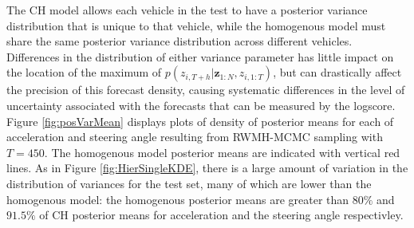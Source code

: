 \documentclass[12pt,a4paper]{article}\usepackage[]{graphicx}\usepackage[]{color}
\begin{document}
\begin{table}[ht]
\centering
{}
\caption{Mean forecast Euclidean error in metres for the the best Naive model, Naive 8, and each time series model at a forecast horizon of one second, two seconds and three seconds. Each time series model performs significantly better than Naive 8, and are very competitive with each other. The use of UVB for the IH model appears to have increased the forecast error relative to MCMC and VB inference for this model.}
\label{table:meanError}
\end{table}

The CH model allows each vehicle in the test to have a posterior variance distribution that is unique to that vehicle, while the homogenous model must share the same posterior variance distribution across different vehicles. Differences in the distribution of either variance parameter has little impact on the location of the maximum of $p(z_{i, T+h} | \textbf{z}_{1:N}, z_{i, 1:T})$, but can drastically affect the precision of this forecast density, causing systematic differences in the level of uncertainty associated with the forecasts that can be measured by the logscore.
\\

Figure \ref{fig:posVarMean} displays plots of density of posterior means for each of acceleration and steering angle resulting from RWMH-MCMC sampling with $T = 450$. The homogenous model posterior means are indicated with vertical red lines. As in Figure \ref{fig:HierSingleKDE}, there is a large amount of variation in the distribution of variances for the test set, many of which are lower than the homogenous model: the homogenous posterior means are greater than $80\%$ and $91.5\%$ of CH posterior means for acceleration and the steering angle respectivley. 
\\
\end{document}

